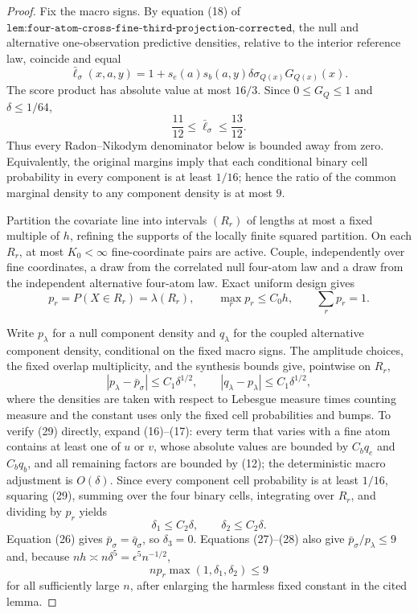 \documentclass{article}
\begin{document}
\begin{proof}
Fix the macro signs.  By equation (18) of \(\texttt{lem:four-atom-cross-fine-third-projection-corrected}\), the null and alternative one-observation predictive densities, relative to the interior reference law, coincide and equal
\[
 \bar \ell_\sigma(x,a,y)
 =1+s_e(a)s_b(a,y)\delta\sigma_{Q(x)}G_{Q(x)}(x).
 \tag{26}
\]
The score product has absolute value at most \(16/3\).  Since \(0\leq G_Q\leq1\) and \(\delta\leq1/64\),
\[
 \frac{11}{12}\leq\bar\ell_\sigma\leq\frac{13}{12}.
 \tag{27}
\]
Thus every Radon--Nikodym denominator below is bounded away from zero.  Equivalently, the original margins imply that each conditional binary cell probability in every component is at least \(1/16\); hence the ratio of the common marginal density to any component density is at most \(9\).

Partition the covariate line into intervals \((R_r)\) of lengths at most a fixed multiple of \(h\), refining the supports of the locally finite squared partition.  On each \(R_r\), at most \(K_0<\infty\) fine-coordinate pairs are active.  Couple, independently over fine coordinates, a draw from the correlated null four-atom law and a draw from the independent alternative four-atom law.  Exact uniform design gives
\[
 p_r=P(X\in R_r)=\lambda(R_r),
 \qquad \max_rp_r\leq C_0h,
 \qquad \sum_rp_r=1.
 \tag{28}
\]

Write \(p_\lambda\) for a null component density and \(q_\lambda\) for the coupled alternative component density, conditional on the fixed macro signs.  The amplitude choices, the fixed overlap multiplicity, and the synthesis bounds give, pointwise on \(R_r\),
\[
 |p_\lambda-\bar p_\sigma|
 \leq C_1\delta^{1/2},
 \qquad
 |q_\lambda-p_\lambda|
 \leq C_1\delta^{1/2},
 \tag{29}
\]
where the densities are taken with respect to Lebesgue measure times counting measure and the constant uses only the fixed cell probabilities and bumps.  To verify (29) directly, expand (16)--(17): every term that varies with a fine atom contains at least one of \(u\) or \(v\), whose absolute values are bounded by \(C_bq_e\) and \(C_bq_b\), and all remaining factors are bounded by (12); the deterministic macro adjustment is \(O(\delta)\).  Since every component cell probability is at least \(1/16\), squaring (29), summing over the four binary cells, integrating over \(R_r\), and dividing by \(p_r\) yields
\[
 \delta_1\leq C_2\delta,
 \qquad \delta_2\leq C_2\delta.
 \tag{30}
\]
Equation (26) gives \(\bar p_\sigma=\bar q_\sigma\), so \(\delta_3=0\).  Equations (27)--(28) also give \(\bar p_\sigma/p_\lambda\leq9\) and, because \(nh\asymp n\delta^5=\epsilon^5n^{-1/2}\),
\[
 np_r\max(1,\delta_1,\delta_2)\leq9
\]
for all sufficiently large \(n\), after enlarging the harmless fixed constant in the cited lemma.


\end{proof}
\end{document}
